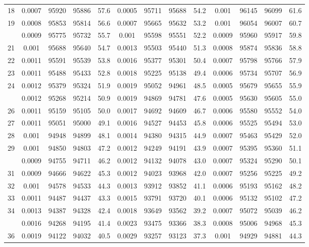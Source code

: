 \documentclass[
  14pt,
]{article}
\begin{document}
\begin{longtable}[t]{lcccccccccccc}
18 & 0.0007 & 95920 & 95886 & 57.6 & 0.0005 & 95711 & 95688 & 54.2 & 0.001 & 96145 & 96099 & 61.6\\
19 & 0.0008 & 95853 & 95814 & 56.6 & 0.0007 & 95665 & 95632 & 53.2 & 0.001 & 96054 & 96007 & 60.7\\
\addlinespace
20 & 0.0009 & 95775 & 95732 & 55.7 & 0.001 & 95598 & 95551 & 52.2 & 0.0009 & 95960 & 95917 & 59.8\\
21 & 0.001 & 95688 & 95640 & 54.7 & 0.0013 & 95503 & 95440 & 51.3 & 0.0008 & 95874 & 95836 & 58.8\\
22 & 0.0011 & 95591 & 95539 & 53.8 & 0.0016 & 95377 & 95301 & 50.4 & 0.0007 & 95798 & 95766 & 57.9\\
23 & 0.0011 & 95488 & 95433 & 52.8 & 0.0018 & 95225 & 95138 & 49.4 & 0.0006 & 95734 & 95707 & 56.9\\
24 & 0.0012 & 95379 & 95324 & 51.9 & 0.0019 & 95052 & 94961 & 48.5 & 0.0005 & 95679 & 95655 & 55.9\\
\addlinespace
25 & 0.0012 & 95268 & 95214 & 50.9 & 0.0019 & 94869 & 94781 & 47.6 & 0.0005 & 95630 & 95605 & 55.0\\
26 & 0.0011 & 95159 & 95105 & 50.0 & 0.0017 & 94692 & 94609 & 46.7 & 0.0006 & 95580 & 95552 & 54.0\\
27 & 0.0011 & 95051 & 95000 & 49.1 & 0.0016 & 94527 & 94453 & 45.8 & 0.0006 & 95525 & 95494 & 53.0\\
28 & 0.001 & 94948 & 94899 & 48.1 & 0.0014 & 94380 & 94315 & 44.9 & 0.0007 & 95463 & 95429 & 52.0\\
29 & 0.001 & 94850 & 94803 & 47.2 & 0.0012 & 94249 & 94191 & 43.9 & 0.0007 & 95395 & 95360 & 51.1\\
\addlinespace
30 & 0.0009 & 94755 & 94711 & 46.2 & 0.0012 & 94132 & 94078 & 43.0 & 0.0007 & 95324 & 95290 & 50.1\\
31 & 0.0009 & 94666 & 94622 & 45.3 & 0.0012 & 94023 & 93968 & 42.0 & 0.0007 & 95256 & 95225 & 49.2\\
32 & 0.001 & 94578 & 94533 & 44.3 & 0.0013 & 93912 & 93852 & 41.1 & 0.0006 & 95193 & 95162 & 48.2\\
33 & 0.0011 & 94487 & 94437 & 43.3 & 0.0015 & 93791 & 93720 & 40.1 & 0.0006 & 95132 & 95102 & 47.2\\
34 & 0.0013 & 94387 & 94328 & 42.4 & 0.0018 & 93649 & 93562 & 39.2 & 0.0007 & 95072 & 95039 & 46.2\\
\addlinespace
35 & 0.0016 & 94268 & 94195 & 41.4 & 0.0023 & 93475 & 93366 & 38.3 & 0.0008 & 95006 & 94968 & 45.3\\
36 & 0.0019 & 94122 & 94032 & 40.5 & 0.0029 & 93257 & 93123 & 37.3 & 0.001 & 94929 & 94881 & 44.3\\

\end{longtable}
\end{document}
